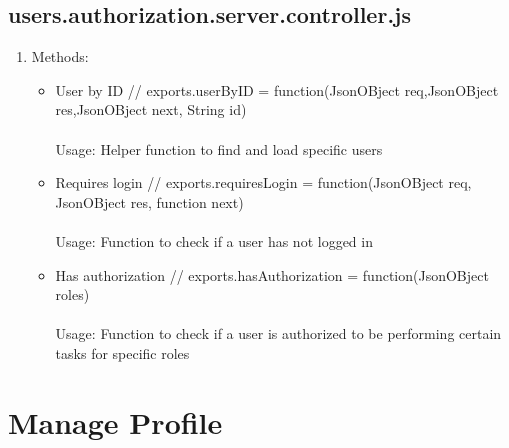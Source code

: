 \documentclass[a4paper,12pt]{report}
\begin{document}
\subsection{users.authorization.server.controller.js}
\begin{enumerate}
\item Methods: 
	\begin{itemize}
		\item User by ID // exports.userByID = function(JsonOBject req,JsonOBject res,JsonOBject next, String id)
		\\ \\ Usage: Helper function to find and load specific users
		\item Requires login // exports.requiresLogin = function(JsonOBject req, JsonOBject res, function next) 
		\\ \\ Usage: Function to check if a user has not logged in
		\item Has authorization // exports.hasAuthorization = function(JsonOBject roles)
		\\ \\ Usage: Function to check if a user is authorized to be performing certain tasks for specific roles
	\end{itemize}

\end{enumerate}


\section{Manage Profile} 
\end{document}
